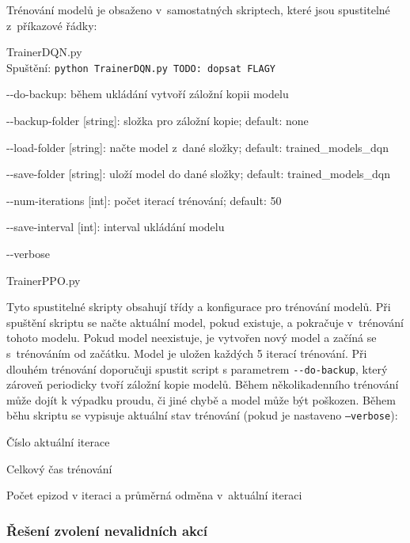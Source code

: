 Trénování modelů je obsaženo v~samostatných skriptech, které jsou spustitelné z~příkazové řádky:
\begin{myitemize}
  \item TrainerDQN.py\\
  Spuštění: \texttt{python TrainerDQN.py {\color{red}TODO: dopsat FLAGY}}
  \begin{myitemize}[${}$]
    \item -{}-do-backup: během ukládání vytvoří záložní kopii modelu
    \item -{}-backup-folder [string]: složka pro záložní kopie; default: none
    \item -{}-load-folder [string]: načte model z~dané složky; default: trained\_models\_dqn
    \item -{}-save-folder [string]: uloží model do dané složky; default: trained\_models\_dqn
    \item -{}-num-iterations [int]: počet iterací trénování; default: 50
    \item -{}-save-interval [int]: interval ukládání modelu
    \item -{}-verbose
  \end{myitemize}
  \item TrainerPPO.py
\end{myitemize}

Tyto spustitelné skripty obsahují třídy a konfigurace pro trénování modelů.
Při spuštění skriptu se načte aktuální model, pokud existuje, a pokračuje v~trénování tohoto modelu.
Pokud model neexistuje, je vytvořen nový model a začíná se s~trénováním od začátku.
Model je uložen každých 5 iterací trénování.
Při dlouhém trénování doporučuji spustit script s parametrem \texttt{-{}-do-backup}, který zároveň periodicky tvoří záložní kopie modelů.
Během několikadenního trénování může dojít k výpadku proudu, či jiné chybě a model může být poškozen.
Během běhu skriptu se vypisuje aktuální stav trénování (pokud je nastaveno \texttt{--verbose}):
\begin{myitemize}
  \item Číslo aktuální iterace
  \item Celkový čas trénování
  \item Počet epizod v iteraci a průměrná odměna v~aktuální iteraci
\end{myitemize}

\subsubsection*{Řešení zvolení nevalidních akcí}
\label{subsubsec:nevalidni_akce}

